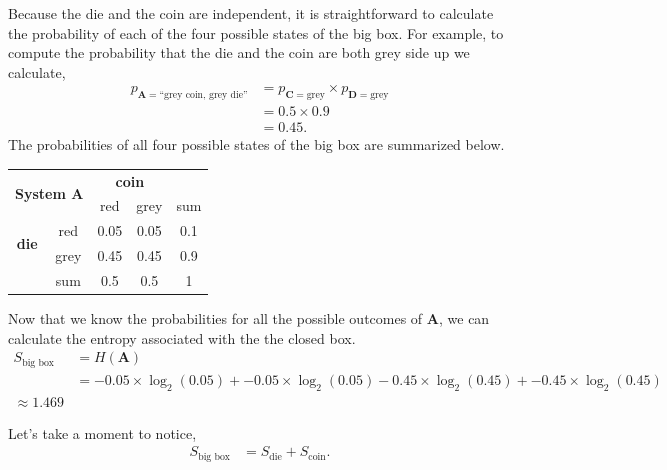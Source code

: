 Because the die and the coin are independent, it is straightforward to calculate the probability of each of the four possible states of the big box.
For example, to compute the probability that the die and the coin are both grey side up we calculate,
\begin{align*}
p_{\bm{A} = \text{``grey coin, grey die''}}
&= p_{\bm{C} = \text{grey}} \times p_{\bm{D} = \text{grey}} \\
&= 0.5 \times 0.9 \\
&= 0.45.
\end{align*}
The probabilities of all four possible states of the big box are summarized below.
\begin{center}
 \begin{tabular}{c c || c | c || c}
 \multicolumn{2}{c}{\multirow{2}{*}{\textbf{System A}}} & \multicolumn{2}{c}{\textbf{coin}} & {}\\
\multicolumn{2}{c}{} & red & grey & sum \\ [0.5ex]
 \hline\hline
\multirow{2}{*}{\textbf{die}} & red & 0.05 & 0.05 & 0.1 \\
 \cline{2-5}
 & grey & 0.45 & 0.45 & 0.9 \\
 \hline\hline
  {} & sum & 0.5 & 0.5 & 1 \\ [1ex]
\end{tabular}
\end{center}

Now that we know the probabilities for all the possible outcomes of $\bm{A}$, we can calculate the entropy associated with the the closed box.
\begin{align*}
S_{\text{big box}}
&=
H(\bm{A}) \\
&=
- 0.05 \times \log_2(0.05)
+ - 0.05 \times \log_2(0.05)
- 0.45 \times \log_2(0.45)
+ - 0.45 \times \log_2(0.45) \\
\approx 1.469
\end{align*}

Let's take a moment to notice,
\begin{align*}
S_{\text{big box}}
&=
S_{\text{die}} + S_{\text{coin}}.
\end{align*}

